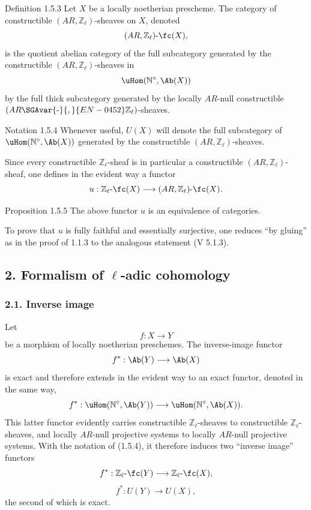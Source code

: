 \begin{statement}{Definition 1.5.3}
Let \(X\) be a locally noetherian prescheme. The category of constructible \((AR,\mathbb Z_\ell)\)-sheaves on \(X\), denoted
\[
(AR,\mathbb Z_\ell)\text{-}\fc(X),
\]
is the quotient abelian category of the full subcategory generated by the constructible \((AR,\mathbb Z_\ell)\)-sheaves in
\[
\uHom(\mathbb N^\circ,\Ab(X))
\]
by the full thick subcategory generated by the locally \(AR\)-null constructible \((AR\SGAvar{\text{-}}{,}{EN-0452}\mathbb Z_\ell)\)-sheaves.
\end{statement}

\begin{statement}{Notation 1.5.4}
Whenever useful, \(U(X)\) will denote the full subcategory of \(\uHom(\mathbb N^\circ,\Ab(X))\) generated by the constructible \((AR,\mathbb Z_\ell)\)-sheaves.
\end{statement}

Since every constructible \(\mathbb Z_\ell\)-sheaf is in particular a constructible \((AR,\mathbb Z_\ell)\)-sheaf, one defines in the evident way a functor
\[
u:\mathbb Z_\ell\text{-}\fc(X)\longrightarrow (AR,\mathbb Z_\ell)\text{-}\fc(X).
\]

\begin{statement}{Proposition 1.5.5}
The above functor \(u\) is an equivalence of categories.
\end{statement}

\begin{prooftext}[Proof]
To prove that \(u\) is fully faithful and essentially surjective, one reduces ``by gluing'' as in the proof of 1.1.3 to the analogous statement (V 5.1.3).
\end{prooftext}

\subsection*{2. Formalism of \(\ell\)-adic cohomology}

\subsubsection*{2.1. Inverse image}

Let
\[
f:X\longrightarrow Y
\]
be a morphism of locally noetherian preschemes. The inverse-image functor
\[
f^*:\Ab(Y)\longrightarrow \Ab(X)
\]
is exact and therefore extends in the evident way to an exact functor, denoted in the same way,
\[
f^*:\uHom(\mathbb N^\circ,\Ab(Y))\longrightarrow \uHom(\mathbb N^\circ,\Ab(X)).
\]
This latter functor evidently carries constructible \(\mathbb Z_\ell\)-sheaves to constructible \(\mathbb Z_\ell\)-sheaves, and locally \(AR\)-null projective systems to locally \(AR\)-null projective systems. With the notation of (1.5.4), it therefore induces two ``inverse image'' functors
\[
f^*:\mathbb Z_\ell\text{-}\fc(Y)\longrightarrow \mathbb Z_\ell\text{-}\fc(X),
\]
\[
f^*:U(Y)\longrightarrow U(X),
\]
the second of which is exact.

